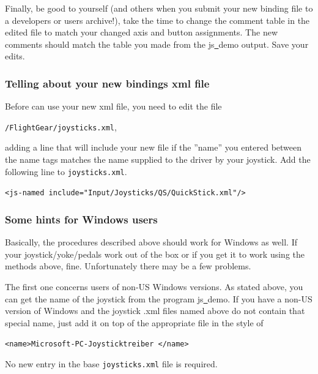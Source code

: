 Finally, be good to yourself (and others when you submit your new binding file to a \FlightGear{} developers or users archive!), take the time to change the comment table in the edited file to match your changed axis and button assignments.  The new comments should match the table you made from the js\underline{~}demo output.  Save your edits.


\subsubsection{Telling \FlightGear{} about your new bindings xml file\label{telling}}
Before \FlightGear{} can use your new xml file, you need to edit the file

\noindent
 \texttt{/FlightGear/joysticks.xml},


\noindent 
adding a line that will include your new file if the ''name'' you entered between the name tags matches the name supplied to the driver by your joystick.  Add the following line to \texttt{joysticks.xml}.
\medskip

\noindent
	\texttt{<js-named include="Input/Joysticks/QS/QuickStick.xml"/>}
\medskip

\subsubsection{Some hints for Windows users\label{joyxp}}
Basically, the procedures described above should work for Windows as well. If your joystick/yoke/pedals work out of the box or if you get it to work using the methods above, fine. Unfortunately there may be a few problems.

The first one concerns users of non-US Windows versions. As stated above, you can get the name of the joystick from the program js\underline{~}demo. If you have a non-US version of Windows and the joystick .xml files named above do not contain that special name, just add it on top of the appropriate file in the style of
\medskip

 \texttt{<name>Microsoft-PC-Joysticktreiber </name>}
 \medskip

\noindent
No new entry in the base \texttt{joysticks.xml} file is required.

